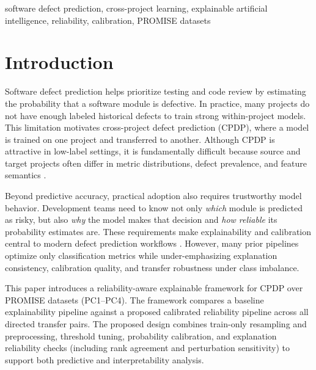 \documentclass[conference]{IEEEtran}
\begin{document}
\begin{IEEEkeywords}
software defect prediction, cross-project learning, explainable artificial intelligence, reliability, calibration, PROMISE datasets
\end{IEEEkeywords}

\section{Introduction}
Software defect prediction helps prioritize testing and code review by estimating the probability that a software module is defective. In practice, many projects do not have enough labeled historical defects to train strong within-project models. This limitation motivates cross-project defect prediction (CPDP), where a model is trained on one project and transferred to another. Although CPDP is attractive in low-label settings, it is fundamentally difficult because source and target projects often differ in metric distributions, defect prevalence, and feature semantics \cite{r7,r8,r16}.

Beyond predictive accuracy, practical adoption also requires trustworthy model behavior. Development teams need to know not only \emph{which} module is predicted as risky, but also \emph{why} the model makes that decision and \emph{how reliable} its probability estimates are. These requirements make explainability and calibration central to modern defect prediction workflows \cite{r10,r11,r12,r13}. However, many prior pipelines optimize only classification metrics while under-emphasizing explanation consistency, calibration quality, and transfer robustness under class imbalance.

This paper introduces a reliability-aware explainable framework for CPDP over PROMISE datasets (PC1--PC4). The framework compares a baseline explainability pipeline against a proposed calibrated reliability pipeline across all directed transfer pairs. The proposed design combines train-only resampling and preprocessing, threshold tuning, probability calibration, and explanation reliability checks (including rank agreement and perturbation sensitivity) to support both predictive and interpretability analysis.
\end{document}
